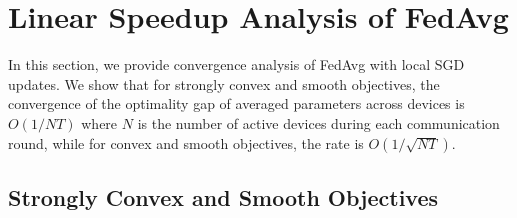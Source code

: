 


\section{Linear Speedup Analysis of FedAvg }

In this section, we provide convergence analysis of FedAvg with local
SGD updates. We show that for strongly convex and smooth objectives,
the convergence of the optimality gap of averaged parameters across
devices is $O(1/NT)$ where $N$ is the number of active devices during
each communication round, while for convex and smooth objectives,
the rate is $O(1/\sqrt{NT})$. 

\subsection{Strongly Convex and Smooth Objectives}

